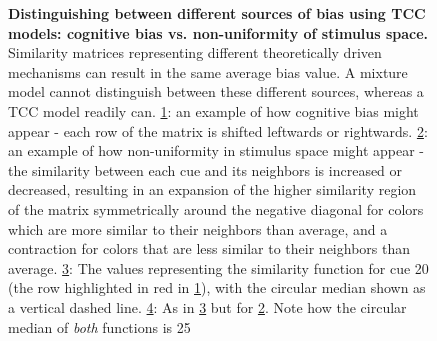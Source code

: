\begin{figure}
    \centering
    \begin{subfigure}[b]{0.49\textwidth}
         \centering
         \caption{}
          
         \label{fig:JustBias}
    \end{subfigure}
    \hfill
    \begin{subfigure}[b]{0.49\textwidth}
         \centering
         \caption{}
                  
         \label{fig:JustColSpace}
    \end{subfigure}

    \begin{subfigure}[b]{0.49\textwidth}
         \centering
         \caption{}
         
         \label{fig:JustBias_subset}
    \end{subfigure}
    \hfill
    \begin{subfigure}[b]{0.49\textwidth}
         \centering
         \caption{}
         
         \label{fig:JustColSpace_subset}
    \end{subfigure}
        \caption{\textbf{Distinguishing between different sources of bias using TCC models: cognitive bias vs. non-uniformity of stimulus space.} Similarity matrices representing different theoretically driven mechanisms can result in the same average bias value. A mixture model cannot distinguish between these different sources, whereas a TCC model readily can. \ref{fig:JustBias}: an example of how cognitive bias might appear - each row of the matrix is shifted leftwards or rightwards. \ref{fig:JustColSpace}: an example of how non-uniformity in stimulus space might appear - the similarity between each cue and its neighbors is increased or decreased, resulting in an expansion of the higher similarity region of the matrix symmetrically around the negative diagonal for colors which are more similar to their neighbors than average, and a contraction for colors that are less similar to their neighbors than average. \ref{fig:JustBias_subset}: The values representing the similarity function for cue 20 (the row highlighted in red in \ref{fig:JustBias}), with the circular median shown as a vertical dashed line. \ref{fig:JustColSpace_subset}: As in \ref{fig:JustBias_subset} but for \ref{fig:JustColSpace}. Note how the circular median of \emph{both} functions is 25}
        \label{fig:distinguishing}
\end{figure}

